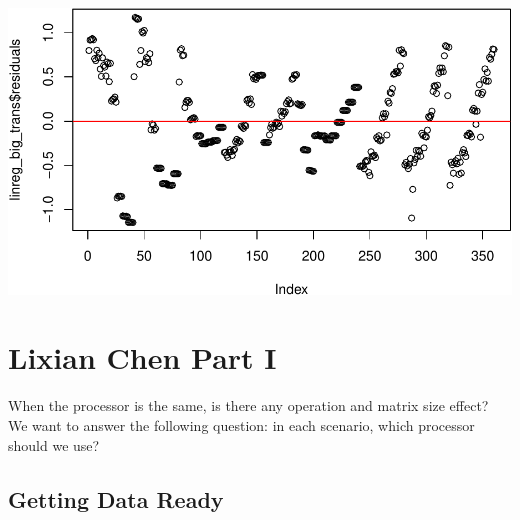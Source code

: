 \documentclass[
]{article}
\begin{document}
\includegraphics{main_files/figure-latex/unnamed-chunk-22-3.pdf}

\hypertarget{lixian-chen-part-i}{%
\section{Lixian Chen Part I}\label{lixian-chen-part-i}}

When the processor is the same, is there any operation and matrix size
effect? We want to answer the following question: in each scenario,
which processor should we use?

\hypertarget{getting-data-ready}{%
\subsection{Getting Data Ready}\label{getting-data-ready}}
\end{document}
